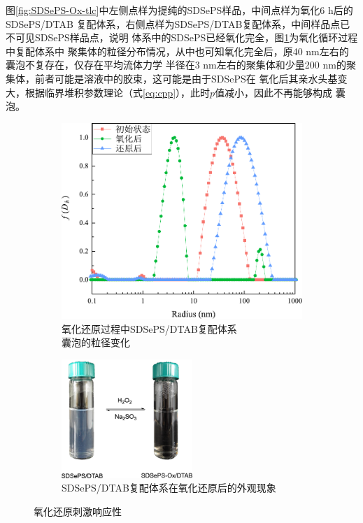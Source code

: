 \documentclass[bachelor,winfonts,replaceperiod]{jnuthesis}
\begin{document}
    图\ref{fig:SDSePS-Ox-tlc}中左侧点样为提纯的SDSePS样品，中间点样为氧化6 h后的SDSePS/DTAB
    复配体系，右侧点样为SDSePS/DTAB复配体系，中间样品点已不可见SDSePS样品点，说明
    体系中的SDSePS已经氧化完全，图\ref{fig:SDSePS-redox-radius}为氧化循环过程中复配体系中
    聚集体的粒径分布情况，从中也可知氧化完全后，原40 nm左右的囊泡不复存在，仅存在平均流体力学
    半径在3 nm左右的聚集体和少量200 nm的聚集体，前者可能是溶液中的胶束，这可能是由于SDSePS在
    氧化后其亲水头基变大，根据临界堆积参数理论（式\ref{eq:cpp}），此时$p$值减小，因此不再能够构成
    囊泡。
    
    \begin{figure}[htbp]
        \begin{subfigure}[]{.5\textwidth}
            \centering
            \includegraphics[width=.8\textwidth]{figure/SDSePS-redox-radius.pdf}
            \caption{氧化还原过程中SDSePS/DTAB复配体系\\ 囊泡的粒径变化}\label{fig:SDSePS-redox-radius}
        \end{subfigure}%
        \begin{subfigure}[]{.5\textwidth}
            \centering
            \includegraphics[height=4.5cm]{figure/scheme-SDSePS-redox.png}
            \caption{SDSePS/DTAB复配体系在氧化还原后的外观现象}\label{fig:scheme-SDSePS-redox}
        \end{subfigure}%
        \caption{氧化还原刺激响应性}
        \label{fig:氧化还原刺激响应性}
    \end{figure}
    
\end{document}
